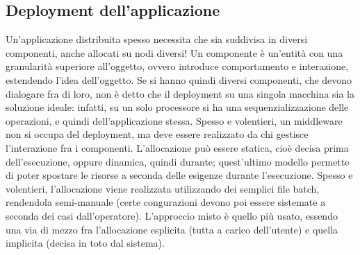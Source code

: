 \subsection{Deployment dell'applicazione}
Un'applicazione distribuita spesso necessita che sia suddivisa in diversi componenti, anche allocati su nodi diversi!
Un componente è un'entità con una granularità superiore all'oggetto, ovvero introduce comportamento e interazione,
estendendo l'idea dell'oggetto.
Se si hanno quindi diversi componenti, che devono dialogare fra di loro, non è detto che il deployment su una singola
macchina sia la soluzione ideale: infatti, su un solo processore si ha una sequenzializzazione delle operazioni, e
quindi dell'applicazione stessa.
Spesso e volentieri, un middleware non si occupa del deployment, ma deve essere realizzato da chi gestisce l'interazione
fra i componenti. L'allocazione può essere statica, cioè decisa prima dell'esecuzione, oppure dinamica, quindi
durante; quest'ultimo modello permette di poter spostare le risorse a seconda delle esigenze durante l'esecuzione.
Spesso e volentieri, l'allocazione viene realizzata utilizzando dei semplici file batch, rendendola semi-manuale (certe
congurazioni devono poi essere sistemate a seconda dei casi dall'operatore).
L'approccio misto è quello più usato, essendo una via di mezzo fra l'allocazione esplicita (tutta a carico dell'utente)
e quella implicita (decisa in toto dal sistema).

